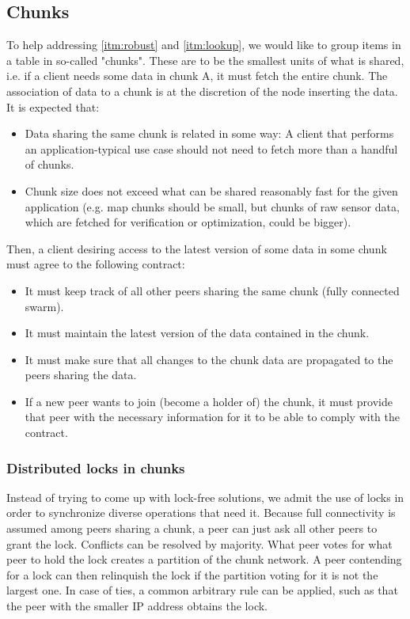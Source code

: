 \documentclass[a4paper, 10pt, conference]{ieeeconf}
\begin{document}
\subsection{Chunks}

To help addressing \ref{itm:robust} and \ref{itm:lookup}, we would like to
group items in a table in so-called "chunks". These are to be the smallest units
of what is shared, i.e. if a client needs some data in chunk A, it must fetch
the entire chunk. The association of data to a chunk
is at the discretion of the node inserting the data. It is expected that:

\begin{itemize}
  \itemsep0em
  \item Data sharing the same chunk is related in some way: A client that
    performs an application-typical use case should not need to fetch more than
    a handful of chunks.
  \item Chunk size does not exceed what can be shared reasonably fast for the
    given application (e.g. map chunks should be small, but chunks of raw
    sensor data, which are fetched for verification or optimization, 
    could be bigger).
\end{itemize}

Then, a client desiring access to the latest version of some data in some chunk
must agree to the following contract:

\begin{itemize}
  \itemsep0em
  \item It must keep track of all other peers sharing the same chunk (fully
    connected swarm).
  \item It must maintain the latest version of the data contained in the chunk.
  \item It must make sure that all changes to the chunk data are propagated to
    the peers sharing the data.
  \item If a new peer wants to join (become a holder of) the chunk, it must 
    provide that peer with the necessary information for it to be able to comply
    with the contract.
\end{itemize}

\subsubsection{Distributed locks in chunks}

Instead of trying to come up with lock-free solutions, we admit the use of
locks in order to synchronize diverse operations that need it. Because full
connectivity is assumed among peers sharing a chunk, a peer can just ask all
other peers to grant the lock. Conflicts can be resolved by majority. What peer
votes for what peer to hold the lock creates a partition of the chunk network.
A peer contending for a lock can then relinquish the lock if the partition 
voting for it is not the largest one. In case of ties, a common arbitrary rule
can be applied, such as that the peer with the smaller IP address obtains the
lock.
\end{document}

